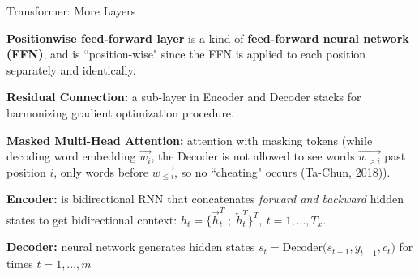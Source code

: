 \begin{frame}{Transformer: More Layers}
    \vspace{30pt}
    
    \begin{itemizeSpaced}{10pt}
        \item \textbf{Positionwise feed-forward layer} is a kind of \textbf{feed-forward neural network (FFN)}, and is ``position-wise" since the FFN is applied to each position separately and identically.
        
        \item \textbf{Residual Connection: }a sub-layer in Encoder and Decoder stacks for harmonizing gradient optimization procedure.
        
        \pinkbox \textbf{Masked Multi-Head Attention: } attention with masking tokens (while decoding word embedding $\overrightarrow{w_i}$, the Decoder is not allowed to see words  $\overrightarrow{w_{>i}}$ past position $i$, only words before $\overrightarrow{w_{\leq i}}$, so no ``cheating" occurs (Ta-Chun, 2018)). 
        
        \item \textbf{Encoder: } is bidirectional RNN that concatenates \emph{forward and backward} hidden states to get bidirectional context: $h_t = \Big \{ \overrightarrow{h}_t^T \; ; \; \overleftarrow{h}_t^T \Big\}^T , \: t=1,...,T_x$. \footnotemark 
        
        \item \textbf{Decoder: } neural network generates hidden states $s_t = \text{Decoder}\Big( s_{t-1}, y_{t-1}, c_t \Big)$ for times $t = 1,..., m$ \footnotemark  
        
    \end{itemizeSpaced}
    
    
    
    
    
\end{frame}


